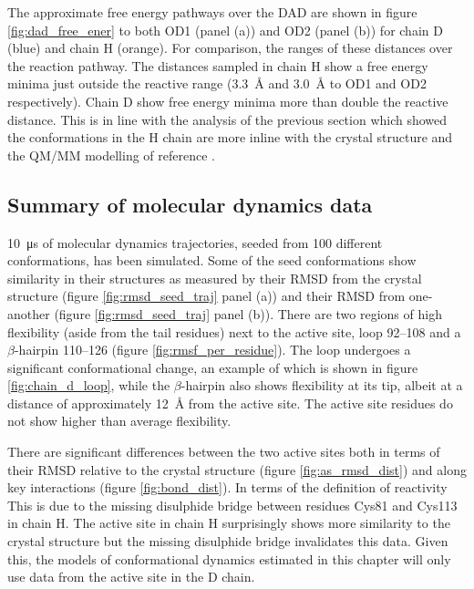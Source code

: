 The approximate free energy pathways over the DAD are shown in figure \ref{fig:dad_free_ener} to both OD1 (panel (a)) and OD2 (panel (b)) for chain D (blue) and chain H (orange).  For comparison, the ranges of these distances over the reaction pathway. The distances sampled in chain H show a free energy minima just outside the reactive range (\SI{3.3}{\angstrom} and \SI{3.0}{\angstrom} to OD1 and OD2 respectively). Chain D show free energy minima more than double the reactive distance.  This is in line with the analysis of the previous section which showed the conformations in the H chain are more inline with the crystal structure and the QM/MM modelling of reference \cite{ranaghanInitioQMMM2017}. 


\subsection{Summary of molecular dynamics data}\label{sec:md_summary}

\SI{10}{\micro\second} of molecular dynamics trajectories, seeded from \num{100} different conformations, has been simulated.  Some of the seed conformations show similarity in their structures as measured by their RMSD from the crystal structure (figure \ref{fig:rmsd_seed_traj} panel (a)) and their RMSD from one-another (figure \ref{fig:rmsd_seed_traj} panel (b)). There are two regions of high flexibility (aside from the tail residues) next to the active site, loop \numrange[range-phrase=\text{--}]{92}{108} and a $\beta$-hairpin \numrange[range-phrase=\text{--}]{110}{126} (figure \ref{fig:rmsf_per_residue}).  The loop undergoes a significant conformational change, an example of which is shown in figure \ref{fig:chain_d_loop}, while the $\beta$-hairpin also shows flexibility at its tip, albeit at a distance of approximately \SI{12}{\angstrom} from the active site. The active site residues do not show higher than average flexibility. 

There are significant differences between the two active sites both in terms of their RMSD relative to the crystal structure (figure \ref{fig:as_rmsd_dist}) and along key interactions (figure \ref{fig:bond_dist}).  In terms of the definition of reactivity This is due to the missing disulphide bridge between residues Cys81 and Cys113 in chain H. The active site in chain H surprisingly shows more similarity to the crystal structure but the  missing disulphide bridge invalidates this data. Given this, the models of conformational dynamics estimated in this chapter will only use data from the active site in the D chain. 


